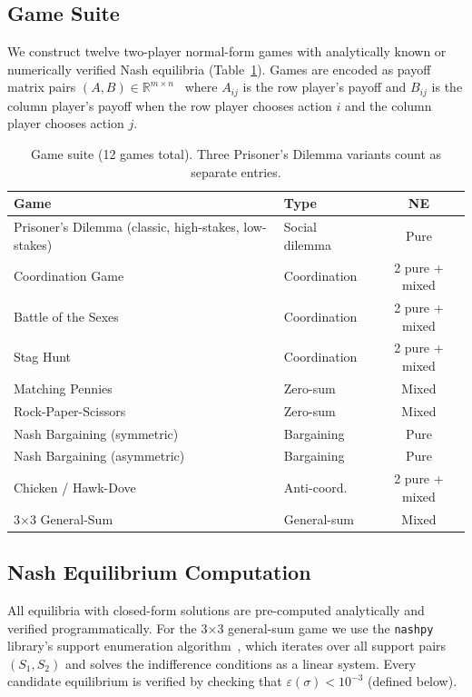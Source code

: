 \documentclass[10pt,twocolumn]{article}
\begin{document}
\subsection{Game Suite}

We construct twelve two-player normal-form games with analytically known or
numerically verified Nash equilibria (Table~\ref{tab:games}).
Games are encoded as payoff matrix pairs $(A, B) \in \mathbb{R}^{m \times n}$~\cite{nisan2007}
where $A_{ij}$ is the row player's payoff and $B_{ij}$ is the column player's payoff
when the row player chooses action $i$ and the column player chooses action $j$.

\begin{table}[t]
\centering
\small
\begin{tabular}{llc}
\toprule
\textbf{Game} & \textbf{Type} & \textbf{NE} \\
\midrule
Prisoner's Dilemma (classic, high-stakes, low-stakes) & Social dilemma & Pure \\
Coordination Game               & Coordination    & 2 pure + mixed \\
Battle of the Sexes             & Coordination    & 2 pure + mixed \\
Stag Hunt                       & Coordination    & 2 pure + mixed \\
Matching Pennies                & Zero-sum        & Mixed \\
Rock-Paper-Scissors             & Zero-sum        & Mixed \\
Nash Bargaining (symmetric)     & Bargaining      & Pure \\
Nash Bargaining (asymmetric)    & Bargaining      & Pure \\
Chicken / Hawk-Dove             & Anti-coord.     & 2 pure + mixed \\
3$\times$3 General-Sum          & General-sum     & Mixed \\
\bottomrule
\end{tabular}
\caption{Game suite (12 games total). Three Prisoner's Dilemma variants count as separate entries.}
\label{tab:games}
\end{table}

\subsection{Nash Equilibrium Computation}

All equilibria with closed-form solutions are pre-computed analytically and verified
programmatically.
For the 3$\times$3 general-sum game we use the \texttt{nashpy} library's support
enumeration algorithm~\cite{nashpy}, which iterates over all support pairs
$(S_1, S_2)$ and solves the indifference conditions as a linear system.
Every candidate equilibrium is verified by checking that
$\varepsilon(\sigma) < 10^{-3}$ (defined below).
\end{document}
